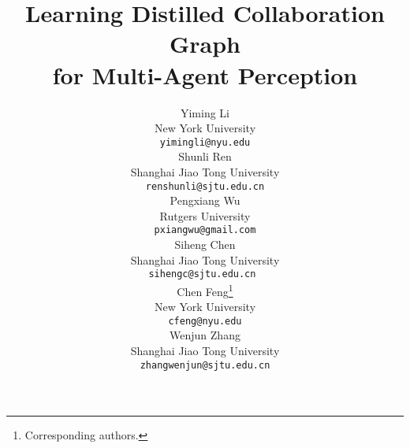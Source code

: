 \documentclass{article}
\begin{document}
\title{Learning Distilled Collaboration Graph \\for Multi-Agent Perception}

\author{Yiming Li\\
  New York University\\
  \texttt{yimingli@nyu.edu} \\
\And
  Shunli Ren \\
  Shanghai Jiao Tong University \\
  \texttt{renshunli@sjtu.edu.cn} \\
  \And
  Pengxiang Wu \\
  Rutgers University \\
  \texttt{pxiangwu@gmail.com} \\
  \And
  Siheng Chen \\
  Shanghai Jiao Tong University \\
  \texttt{sihengc@sjtu.edu.cn } \\
  \And
  Chen Feng\thanks{Corresponding authors.}\\
  New York University\\
  \texttt{cfeng@nyu.edu} \\
  \And
  Wenjun Zhang \\
  Shanghai Jiao Tong University \\
  \texttt{zhangwenjun@sjtu.edu.cn} \\
}
\maketitle
\end{document}
